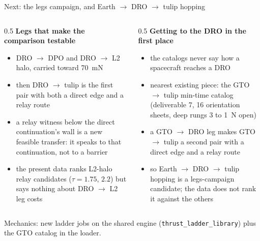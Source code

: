 \documentclass[aspectratio=169,10pt]{beamer}
\newcommand{\key}[1]{\texttt{#1}}
\begin{document}
\begin{frame}{Next: the legs campaign, and Earth $\to$ DRO $\to$ tulip hopping}
  \small
  \begin{columns}[T]
    \begin{column}{0.5\textwidth}
      \textbf{Legs that make the comparison testable}
      \begin{itemize}
        \item DRO $\to$ DPO and DRO $\to$ L2 halo, carried toward 70~mN
        \item then DRO $\to$ tulip is the first pair with both a direct edge and a relay route
        \item a relay witness below the direct continuation's wall is a new feasible transfer: it speaks to that continuation, not to a barrier
        \item the present data ranks L2-halo relay candidates ($\tau=1.75$, $2.2$) but says nothing about DRO $\to$ L2 leg costs
      \end{itemize}
    \end{column}
    \begin{column}{0.5\textwidth}
      \textbf{Getting to the DRO in the first place}
      \begin{itemize}
        \item the catalogs never say how a spacecraft reaches a DRO
        \item nearest existing piece: the GTO $\to$ tulip min-time catalog (deliverable 7, 16 orientation sheets, deep rungs 3 to 1~N open)
        \item a GTO $\to$ DRO leg makes GTO $\to$ tulip a second pair with a direct edge and a relay route
        \item so Earth $\to$ DRO $\to$ tulip hopping is a legs-campaign candidate; the data does not rank it against the others
      \end{itemize}
    \end{column}
  \end{columns}
  \vspace{8pt}
  Mechanics: new ladder jobs on the shared engine (\key{thrust\_ladder\_library}) plus the GTO catalog in the loader.
\end{frame}
\end{document}
